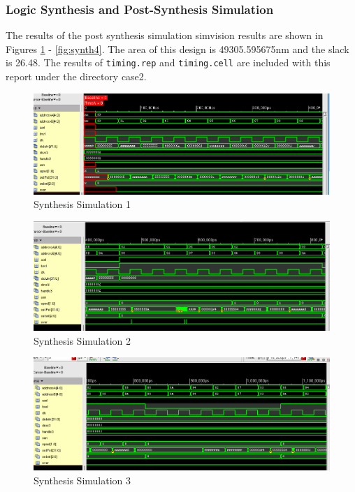 \documentclass[12pt]{article}
\begin{document}
\subsubsection{Logic Synthesis and Post-Synthesis Simulation}
The results of the post synthesis simulation simvision results are shown in Figures \ref{fig:synth1} - \ref{fig:synth4}. The area of this design is 49305.595675nm and the slack is 26.48. The results of \texttt{timing.rep} and \texttt{timing.cell} are included with this report under the directory case2.
\begin{figure}[H]
\centering
\includegraphics[width=\linewidth]{../case2/synth1}
\caption{Synthesis Simulation 1}
\label{fig:synth1}
\end{figure}
\begin{figure}[H]
\centering
\includegraphics[width=\linewidth]{../case2/synth2}
\caption{Synthesis Simulation 2}
\label{fig:synth2}
\end{figure}
\begin{figure}[H]
\centering
\includegraphics[width=\linewidth]{../case2/synth3}
\caption{Synthesis Simulation 3}
\label{fig:synth3}
\end{figure}
\end{document}
